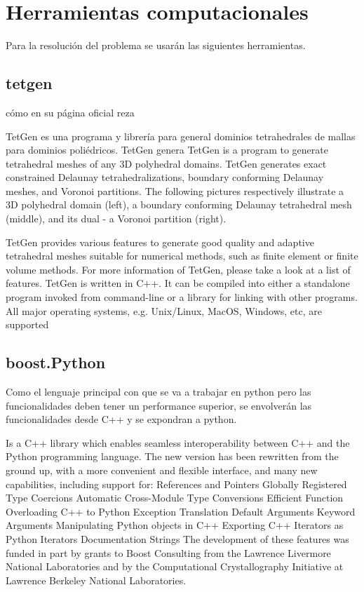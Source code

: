 \section{Herramientas computacionales}
Para la resolución del problema se usarán las siguientes herramientas.

\subsection{tetgen}

cómo en su página oficial reza

TetGen es una programa y librería para general dominios tetrahedrales
de mallas para dominios poliédricos. TetGen genera TetGen is a program
to generate tetrahedral meshes of any 3D polyhedral domains. TetGen
generates exact constrained Delaunay tetrahedralizations, boundary
conforming Delaunay meshes, and Voronoi partitions. The following
pictures respectively illustrate a 3D polyhedral domain (left), a
boundary conforming Delaunay tetrahedral mesh (middle), and its dual -
a Voronoi partition (right).
    
TetGen provides various features to generate good quality and adaptive
tetrahedral meshes suitable for numerical methods, such as finite
element or finite volume methods. For more information of TetGen,
please take a look at a list of features.  TetGen is written in
C++. It can be compiled into either a standalone program invoked from
command-line or a library for linking with other programs. All major
operating systems, e.g. Unix/Linux, MacOS, Windows, etc, are supported

\subsection{boost.Python}

Como el lenguaje principal con que se va a trabajar en python pero las
funcionalidades deben tener un performance superior, se envolverán las
funcionalidades desde C++ y se expondran a python.

Is a C++ library which enables seamless interoperability between C++
and the Python programming language. The new version has been
rewritten from the ground up, with a more convenient and flexible
interface, and many new capabilities, including support for:
References and Pointers Globally Registered Type Coercions Automatic
Cross-Module Type Conversions Efficient Function Overloading C++ to
Python Exception Translation Default Arguments Keyword Arguments
Manipulating Python objects in C++ Exporting C++ Iterators as Python
Iterators Documentation Strings The development of these features was
funded in part by grants to Boost Consulting from the Lawrence
Livermore National Laboratories and by the Computational
Crystallography Initiative at Lawrence Berkeley National Laboratories.

